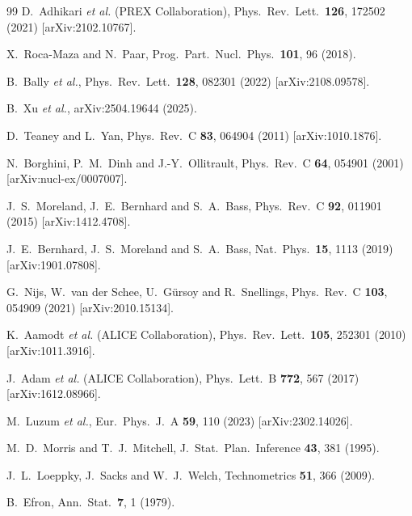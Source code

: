 \documentclass[12pt,a4paper,twoside]{report}
\begin{document}
\begin{thebibliography}{99}
  D.~Adhikari \textit{et al.} (PREX Collaboration),
  Phys.\ Rev.\ Lett.\ \textbf{126}, 172502 (2021)
  [arXiv:2102.10767].

  X.~Roca-Maza and N.~Paar,
  Prog.\ Part.\ Nucl.\ Phys.\ \textbf{101}, 96 (2018).

  B.~Bally \textit{et al.},
  Phys.\ Rev.\ Lett.\ \textbf{128}, 082301 (2022)
  [arXiv:2108.09578].

  B.~Xu \textit{et al.},
  arXiv:2504.19644 (2025).

  D.~Teaney and L.~Yan,
  Phys.\ Rev.\ C \textbf{83}, 064904 (2011)
  [arXiv:1010.1876].

  N.~Borghini, P.~M.~Dinh and J.-Y.~Ollitrault,
  Phys.\ Rev.\ C \textbf{64}, 054901 (2001)
  [arXiv:nucl-ex/0007007].

  J.~S.~Moreland, J.~E.~Bernhard and S.~A.~Bass,
  Phys.\ Rev.\ C \textbf{92}, 011901 (2015)
  [arXiv:1412.4708].

  J.~E.~Bernhard, J.~S.~Moreland and S.~A.~Bass,
  Nat.\ Phys.\ \textbf{15}, 1113 (2019)
  [arXiv:1901.07808].

  G.~Nijs, W.~van der Schee, U.~G\"ursoy and R.~Snellings,
  Phys.\ Rev.\ C \textbf{103}, 054909 (2021)
  [arXiv:2010.15134].

  K.~Aamodt \textit{et al.} (ALICE Collaboration),
  Phys.\ Rev.\ Lett.\ \textbf{105}, 252301 (2010)
  [arXiv:1011.3916].

  J.~Adam \textit{et al.} (ALICE Collaboration),
  Phys.\ Lett.\ B \textbf{772}, 567 (2017)
  [arXiv:1612.08966].

  M.~Luzum \textit{et al.},
  Eur.\ Phys.\ J.\ A \textbf{59}, 110 (2023)
  [arXiv:2302.14026].

  M.~D.~Morris and T.~J.~Mitchell,
  J.\ Stat.\ Plan.\ Inference \textbf{43}, 381 (1995).

  J.~L.~Loeppky, J.~Sacks and W.~J.~Welch,
  Technometrics \textbf{51}, 366 (2009).

  B.~Efron,
  Ann.\ Stat.\ \textbf{7}, 1 (1979).

\end{thebibliography}
\end{document}
